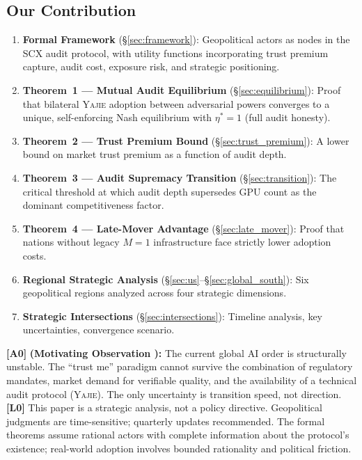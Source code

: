 \documentclass[11pt,a4paper]{article}
\theoremstyle{definition}
\theoremstyle{remark}
\newcommand{\assumptionTag}[1]{\textsf{\textbf{[A#1]}}}
\newcommand{\limitationTag}[1]{\textsf{\textbf{[L#1]}}}
\newcommand{\SCX}{\textsc{SCX}}
\newcommand{\Yajie}{\textsc{Yajie}}
\newcommand{\MAone}{M=1}
\begin{document}
\subsection{Our Contribution}
\begin{enumerate}[label=(\roman*)]
    \item \textbf{Formal Framework} (\S\ref{sec:framework}): Geopolitical actors as nodes in the \SCX{} audit protocol, with utility functions incorporating trust premium capture, audit cost, exposure risk, and strategic positioning.
    \item \textbf{Theorem~1 --- Mutual Audit Equilibrium} (\S\ref{sec:equilibrium}): Proof that bilateral \Yajie{} adoption between adversarial powers converges to a unique, self-enforcing Nash equilibrium with $\eta^* = 1$ (full audit honesty).
    \item \textbf{Theorem~2 --- Trust Premium Bound} (\S\ref{sec:trust_premium}): A lower bound on market trust premium as a function of audit depth.
    \item \textbf{Theorem~3 --- Audit Supremacy Transition} (\S\ref{sec:transition}): The critical threshold at which audit depth supersedes GPU count as the dominant competitiveness factor.
    \item \textbf{Theorem~4 --- Late-Mover Advantage} (\S\ref{sec:late_mover}): Proof that nations without legacy $\MAone$ infrastructure face strictly lower adoption costs.
    \item \textbf{Regional Strategic Analysis} (\S\ref{sec:us}--\S\ref{sec:global_south}): Six geopolitical regions analyzed across four strategic dimensions.
    \item \textbf{Strategic Intersections} (\S\ref{sec:intersections}): Timeline analysis, key uncertainties, convergence scenario.
\end{enumerate}
\assumptionTag{0} \textbf{(Motivating Observation ):} The current global AI order is structurally unstable. The ``trust me'' paradigm cannot survive the combination of regulatory mandates, market demand for verifiable quality, and the availability of a technical audit protocol (\Yajie). The only uncertainty is transition speed, not direction.
\limitationTag{0} This paper is a strategic analysis, not a policy directive. Geopolitical judgments are time-sensitive; quarterly updates recommended. The formal theorems assume rational actors with complete information about the protocol's existence; real-world adoption involves bounded rationality and political friction.
\end{document}
